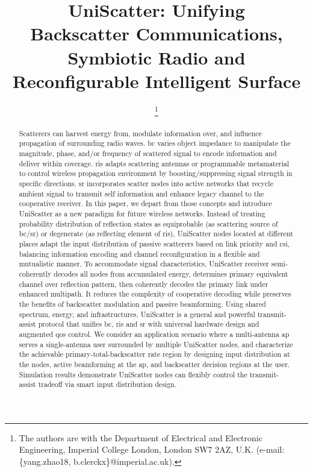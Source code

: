 \documentclass[journal]{IEEEtran}
\begin{document}
\title{UniScatter: Unifying\\Backscatter Communications, Symbiotic Radio and Reconfigurable Intelligent Surface}
\author{
	\thanks{
		The authors are with the Department of Electrical and Electronic Engineering, Imperial College London, London SW7 2AZ, U.K. (e-mail: \{yang.zhao18, b.clerckx\}@imperial.ac.uk).
	}
}
\maketitle

\begin{abstract}
	Scatterers can harvest energy from, modulate information over, and influence propagation of surrounding radio waves.
	\gls{bc} varies object impedance to manipulate the magnitude, phase, and/or frequency of scattered signal to encode information and deliver within coverage.
	\gls{ris} adapts scattering antennas or programmable metamaterial to control wireless propagation environment by boosting/suppressing signal strength in specific directions.
	\gls{sr} incorporates scatter nodes into active networks that recycle ambient signal to transmit self information and enhance legacy channel to the cooperative receiver.
	In this paper, we depart from those concepts and introduce UniScatter as a new paradigm for future wireless networks.
	Instead of treating probability distribution of reflection states as equiprobable (as scattering source of \gls{bc}/\gls{sr}) or degenerate (as reflecting element of \gls{ris}), UniScatter nodes located at different places adapt the input distribution of passive scatterers based on link priority and \gls{csi}, balancing information encoding and channel reconfiguration in a flexible and mutualistic manner.
	To accommodate signal characteristics, UniScatter receiver semi-coherently decodes all nodes from accumulated energy, determines primary equivalent channel over reflection pattern, then coherently decodes the primary link under enhanced multipath.
	It reduces the complexity of cooperative decoding while preserves the benefits of backscatter modulation and passive beamforming.
	Using shared spectrum, energy, and infrastructures, UniScatter is a general and powerful transmit-assist protocol that unifies \gls{bc}, \gls{ris} and \gls{sr} with universal hardware design and augmented \gls{qos} control.
	We consider an application scenario where a multi-antenna \gls{ap} serves a single-antenna user surrounded by multiple UniScatter nodes, and characterize the achievable primary-total-backscatter rate region by designing input distribution at the nodes, active beamforming at the \gls{ap}, and backscatter decision regions at the user.
	Simulation results demonstrate UniScatter nodes can flexibly control the transmit-assist tradeoff via smart input distribution design.
\end{abstract}
\end{document}
